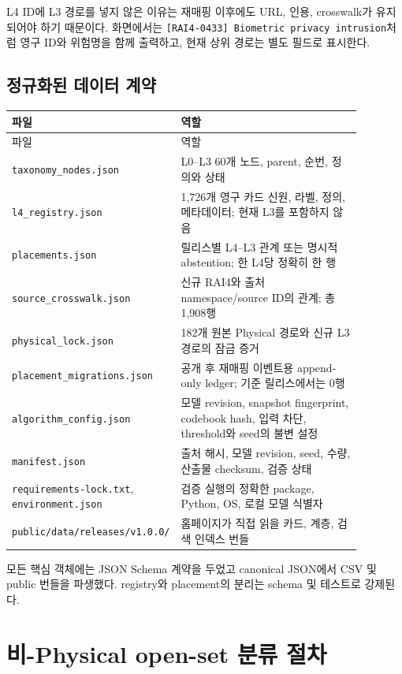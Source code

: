 \documentclass[11pt,a4paper]{article}
\newcommand{\code}[1]{\texttt{#1}}
\begin{document}
L4 ID에 L3 경로를 넣지 않은 이유는 재매핑 이후에도 URL, 인용, crosswalk가 유지되어야 하기 때문이다. 화면에서는 \code{[RAI4-0433] Biometric privacy intrusion}처럼 영구 ID와 위험명을 함께 출력하고, 현재 상위 경로는 별도 필드로 표시한다.

\subsection{정규화된 데이터 계약}

\begin{longtable}{L{0.32\linewidth}L{0.56\linewidth}}
\toprule
파일 & 역할 \\
\midrule
\endfirsthead
\toprule
파일 & 역할 \\
\midrule
\endhead
\code{taxonomy\_nodes.json} & L0--L3 60개 노드, parent, 순번, 정의와 상태 \\
\code{l4\_registry.json} & 1,726개 영구 카드 신원, 라벨, 정의, 메타데이터; 현재 L3를 포함하지 않음 \\
\code{placements.json} & 릴리스별 L4--L3 관계 또는 명시적 abstention; 한 L4당 정확히 한 행 \\
\code{source\_crosswalk.json} & 신규 RAI4와 출처 namespace/source ID의 관계; 총 1,908행 \\
\code{physical\_lock.json} & 182개 원본 Physical 경로와 신규 L3 경로의 잠금 증거 \\
\code{placement\_migrations.json} & 공개 후 재매핑 이벤트용 append-only ledger; 기준 릴리스에서는 0행 \\
\code{algorithm\_config.json} & 모델 revision, snapshot fingerprint, codebook hash, 입력 차단, threshold와 seed의 불변 설정 \\
\code{manifest.json} & 출처 해시, 모델 revision, seed, 수량, 산출물 checksum, 검증 상태 \\
\code{requirements-lock.txt}, \code{environment.json} & 검증 실행의 정확한 package, Python, OS, 로컬 모델 식별자 \\
\nolinkurl{public/data/releases/v1.0.0/} & 홈페이지가 직접 읽을 카드, 계층, 검색 인덱스 번들 \\
\bottomrule
\end{longtable}

모든 핵심 객체에는 JSON Schema 계약을 두었고 canonical JSON에서 CSV 및 public 번들을 파생했다. registry와 placement의 분리는 schema 및 테스트로 강제된다.

\section{비-Physical open-set 분류 절차}
\end{document}
